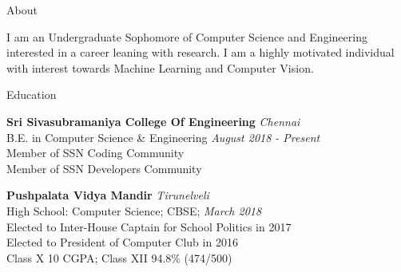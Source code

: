 \documentclass{resume} %
\begin{document}

\begin{rSection}{About}

I am an Undergraduate Sophomore of Computer Science and Engineering interested in a career leaning with research. I am a highly motivated individual with interest towards Machine Learning and Computer Vision. 

\end{rSection}



\begin{rSection}{Education}

{\bf Sri Sivasubramaniya College Of Engineering} \hfill {\em Chennai} \\ 
B.E. in Computer Science \& Engineering  \hfill {\em August 2018 - Present} \\ 
Member of SSN Coding Community\\
Member of SSN Developers Community

{\bf Pushpalata Vidya Mandir} \hfill {\em Tirunelveli} \\ 
High School: Computer Science; CBSE; \hfill {\em March 2018 } \\ 
Elected to Inter-House Captain for School Politics in 2017 \\
Elected to President of Computer Club in 2016 \\
Class X 10 CGPA; Class XII 94.8\% (474/500)  

\end{rSection}

\end{document}
